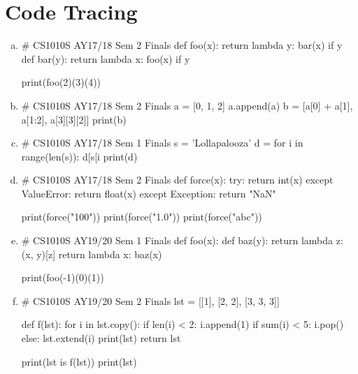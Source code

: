 \section{Code Tracing}
\begin{enumerate}[(a)]
\item
\begin{python}
# CS1010S AY17/18 Sem 2 Finals
def foo(x):
    return lambda y: bar(x) if y %
def bar(y):
    return lambda x: foo(x) if y %

print(foo(2)(3)(4))
\end{python}

\item
\begin{python}
# CS1010S AY17/18 Sem 2 Finals
a = [0, 1, 2]
a.append(a)
b = [a[0] + a[1], a[1:2], a[3][3][2]]
print(b)
\end{python}

\item
\begin{python}
# CS1010S AY17/18 Sem 1 Finals
s = 'Lollapalooza'
d = {}
for i in range(len(s)):
    d[s[i %
print(d)
\end{python}

\item
\begin{python}
# CS1010S AY17/18 Sem 2 Finals
def force(x):
    try:
        return int(x)
    except ValueError:
        return float(x)
    except Exception:
        return "NaN"

print(force("100"))
print(force("1.0"))
print(force("abc"))
\end{python}

\newpage
\item
\begin{python}
# CS1010S AY19/20 Sem 1 Finals
def foo(x):
    def baz(y):
        return lambda z: (x, y)[z]
    return lambda x: baz(x)

print(foo(-1)(0)(1))
\end{python}

\item
\begin{python}
# CS1010S AY19/20 Sem 2 Finals
lst = [[1], [2, 2], [3, 3, 3]]

def f(lst):
    for i in lst.copy():
        if len(i) < 2:
            i.append(1)
        if sum(i) < 5:
            i.pop()
        else:
            lst.extend(i)
        print(lst)
    return lst

print(lst is f(lst))
print(lst)
\end{python}


\end{enumerate}

